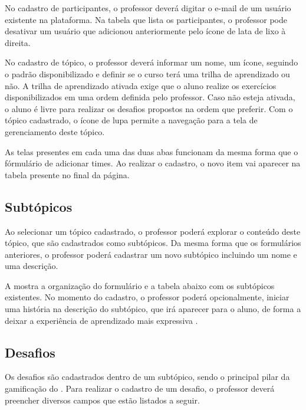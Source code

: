 No cadastro de participantes, o professor deverá digitar o e-mail de um usuário existente na plataforma. Na tabela que lista os participantes, o professor pode desativar um usuário que adicionou anteriormente pelo ícone de lata de lixo à direita.


No cadastro de tópico, o professor deverá informar um nome, um ícone, seguindo o padrão disponibilizado e definir se o curso terá uma trilha de aprendizado ou não. A trilha de aprendizado ativada exige que o aluno realize os exercícios disponibilizados em uma ordem definida pelo professor. Caso não esteja ativada, o aluno é livre para realizar os desafios propostos na ordem que preferir. Com o tópico cadastrado, o ícone de lupa permite a navegação para a tela de gerenciamento deste tópico.

As telas presentes em cada uma das duas abas funcionam da mesma forma que o fórmulário de adicionar times. Ao realizar o cadastro, o novo item vai aparecer na tabela presente no final da página.

\subsection{Subtópicos}

Ao selecionar um tópico cadastrado, o professor poderá explorar o conteúdo deste tópico, que são cadastrados como subtópicos. Da mesma forma que os formulários anteriores, o professor poderá cadastrar um novo subtópico incluindo um nome e uma descrição.


A  mostra a organização do formulário e a tabela abaixo com os subtópicos existentes. No momento do cadastro, o professor poderá opcionalmente, iniciar uma história na descrição do subtópico, que irá aparecer para o aluno, de forma a deixar a experiência de aprendizado mais expressiva \cite{gamification_motivates}.

\subsection{Desafios}

Os desafios são cadastrados dentro de um subtópico, sendo o principal pilar da gamificação do \appName. Para realizar o cadastro de um desafio, o professor deverá preencher diversos campos que estão listados a seguir.

